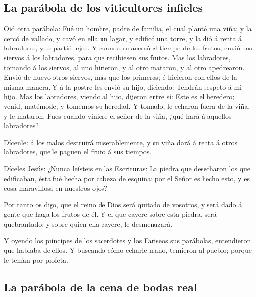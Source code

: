 \hypertarget{la-paruxe1bola-de-los-viticultores-infieles}{%
\subsection{La parábola de los viticultores
infieles}\label{la-paruxe1bola-de-los-viticultores-infieles}}

 Oid otra parábola: Fué un hombre, padre de familia, el
cual plantó una viña; y la cercó de vallado, y cavó en ella un lagar, y
edificó una torre, y la dió á renta á labradores, y se partió lejos.
 Y cuando se acercó el tiempo de los frutos, envió sus
siervos á los labradores, para que recibiesen sus frutos. 
Mas los labradores, tomando á los siervos, al uno hirieron, y al otro
mataron, y al otro apedrearon.  Envió de nuevo otros
siervos, más que los primeros; é hicieron con ellos de la misma manera.
 Y á la postre les envió su hijo, diciendo: Tendrán respeto
á mi hijo.  Mas los labradores, viendo al hijo, dijeron
entre sí: Este es el heredero; venid, matémosle, y tomemos su heredad.
 Y tomado, le echaron fuera de la viña, y le mataron.
 Pues cuando viniere el señor de la viña, ¿qué hará á
aquellos labradores?

 Dícenle: á los malos destruirá miserablemente, y su viña
dará á renta á otros labradores, que le paguen el fruto á sus tiempos.

 Díceles Jesús: ¿Nunca leísteis en las Escrituras: La
piedra que desecharon los que edificaban, ésta fué hecha por cabeza de
esquina: por el Señor es hecho esto, y es cosa maravillosa en nuestros
ojos?

 Por tanto os digo, que el reino de Dios será quitado de
vosotros, y será dado á gente que haga los frutos de él.  Y
el que cayere sobre esta piedra, será quebrantado; y sobre quien ella
cayere, le desmenuzará.

 Y oyendo los príncipes de los sacerdotes y los Fariseos
sus parábolas, entendieron que hablaba de ellos.  Y
buscando cómo echarle mano, temieron al pueblo; porque le tenían por
profeta.

\hypertarget{la-paruxe1bola-de-la-cena-de-bodas-real}{%
\subsection{La parábola de la cena de bodas
real}\label{la-paruxe1bola-de-la-cena-de-bodas-real}}

